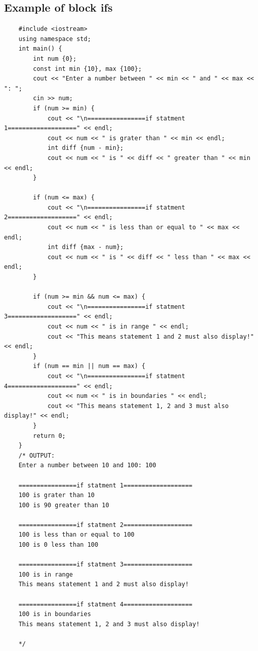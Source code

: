 \subsection{Example of block ifs}
\begin{verbatim}
    #include <iostream>
    using namespace std;
    int main() {
        int num {0};
        const int min {10}, max {100};
        cout << "Enter a number between " << min << " and " << max << ": ";
        cin >> num;
        if (num >= min) {
            cout << "\n================if statment 1===================" << endl;
            cout << num << " is grater than " << min << endl;
            int diff {num - min};
            cout << num << " is " << diff << " greater than " << min << endl;
        }

        if (num <= max) {
            cout << "\n================if statment 2===================" << endl;
            cout << num << " is less than or equal to " << max << endl;
            int diff {max - num};
            cout << num << " is " << diff << " less than " << max << endl;
        }

        if (num >= min && num <= max) {
            cout << "\n================if statment 3===================" << endl;
            cout << num << " is in range " << endl;
            cout << "This means statement 1 and 2 must also display!" << endl;
        }
        if (num == min || num == max) {
            cout << "\n================if statment 4===================" << endl;
            cout << num << " is in boundaries " << endl;
            cout << "This means statement 1, 2 and 3 must also display!" << endl;
        }
        return 0;
    }
    /* OUTPUT:
    Enter a number between 10 and 100: 100

    ================if statment 1===================
    100 is grater than 10
    100 is 90 greater than 10

    ================if statment 2===================
    100 is less than or equal to 100
    100 is 0 less than 100

    ================if statment 3===================
    100 is in range
    This means statement 1 and 2 must also display!

    ================if statment 4===================
    100 is in boundaries
    This means statement 1, 2 and 3 must also display!

    */
\end{verbatim}


